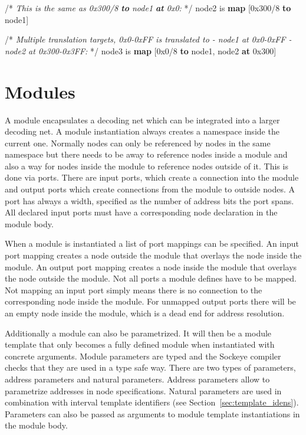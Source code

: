 \documentclass[a4paper,11pt,twoside]{report}
\begin{document}
{{{\begin{syntax}
    /* \textit{This is the same as \textup{0x300/8 \textbf{to} node1 \textbf{at} 0x0}:} */
    node2 is \textbf{map} [0x300/8 \textbf{to} node1]

    /* \textit{Multiple translation targets, \textup{0x0-0xFF} is translated to
       - \textup{node1} at \textup{0x0-0xFF}
       - \textup{node2} at \textup{0x300-0x3FF}:} */
    node3 is \textbf{map} [0x0/8 \textbf{to} node1, node2 \textbf{at} 0x300]
\end{syntax}

\section{Modules}
\label{sec:modules}
A module encapsulates a decoding net which can be integrated into a larger decoding net.
A module instantiation always creates a namespace inside the current one.
Normally nodes can only be referenced by nodes in the same namespace but there needs to be away to reference nodes inside a module and also a way for nodes inside the module to reference nodes outside of it.
This is done via ports.
There are input ports, which create a connection into the module and output ports which create connections from the module to outside nodes.
A port has always a width, specified as the number of address bits the port spans.
All declared input ports must have a corresponding node declaration in the module body.

When a module is instantiated a list of port mappings can be specified.
An input port mapping creates a node outside the module that overlays the node inside the module.
An output port mapping creates a node inside the module that overlays the node outside the module.
Not all ports a module defines have to be mapped.
Not mapping an input port simply means there is no connection to the corresponding node inside the module.
For unmapped output ports there will be an empty node inside the module, which is a dead end for address resolution.

Additionally a module can also be parametrized.
It will then be a module template that only becomes a fully defined module when instantiated with concrete arguments.
Module parameters are typed and the Sockeye compiler checks that they are used in a type safe way.
There are two types of parameters, address parameters and natural parameters.
Address parameters allow to parametrize addresses in node specifications.
Natural parameters are used in combination with interval template identifiers (see Section~\ref{sec:template_idens}).
Parameters can also be passed as arguments to module template instantiations in the module body.

}}}
\end{document}
